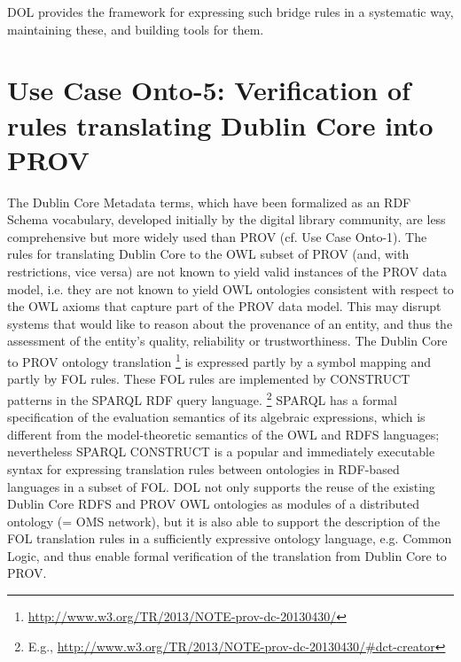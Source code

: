 \documentclass[10pt,%
\ifpretendfinal
final%
\else
draft%
\fi,
]{scrreprt}
\begin{document}
DOL  provides the framework for expressing such bridge rules in a systematic way, maintaining these, and building tools for them. 

\section{Use Case Onto-5: Verification of rules translating Dublin Core into PROV}
The Dublin Core Metadata terms, which have been formalized as an RDF Schema vocabulary, developed initially by the digital library community, are less 
comprehensive but more widely used than PROV (cf. Use Case Onto-1). The rules for translating Dublin Core to the OWL subset of PROV (and, with restrictions, 
vice versa) are not known to yield valid instances of the PROV data model, i.e. they are not known to yield OWL ontologies consistent with respect to the OWL axioms that 
capture part of the PROV data model. This may disrupt systems that would like to reason about the provenance of an entity, and thus the assessment of the 
entity's quality, reliability or trustworthiness.
The Dublin Core to PROV ontology translation%
\footnote{\url{http://www.w3.org/TR/2013/NOTE-prov-dc-20130430/}}
  is expressed partly by a symbol mapping and partly by FOL rules. These FOL rules are implemented by CONSTRUCT patterns in the SPARQL RDF query language.%
\footnote{E.g., \url{http://www.w3.org/TR/2013/NOTE-prov-dc-20130430/\#dct-creator}} 
SPARQL has a formal specification of the evaluation semantics of its algebraic expressions, which is different from the model-theoretic semantics of the OWL and RDFS languages; nevertheless SPARQL CONSTRUCT is a popular and immediately executable syntax for expressing translation rules between ontologies in RDF-based languages in a subset of FOL.
DOL  not only supports the reuse of the existing Dublin Core RDFS and PROV OWL ontologies as modules of a distributed ontology (= OMS network), but it is also able to support the description of the FOL translation rules in a sufficiently expressive ontology language, e.g. Common Logic, and thus enable formal verification of the translation from Dublin Core to PROV.
\end{document}
